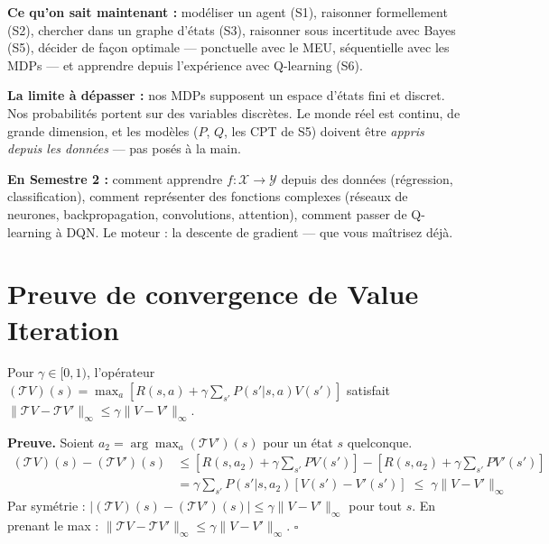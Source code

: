 \documentclass[11pt,a4paper]{article}
\begin{document}
\begin{prereqbox}
\textbf{Ce qu'on sait maintenant :} modéliser un agent (S1), raisonner formellement (S2), chercher dans un graphe d'états (S3), raisonner sous incertitude avec Bayes (S5), décider de façon optimale --- ponctuelle avec le MEU, séquentielle avec les MDPs --- et apprendre depuis l'expérience avec Q-learning (S6).

\textbf{La limite à dépasser :} nos MDPs supposent un espace d'états fini et discret. Nos probabilités portent sur des variables discrètes. Le monde réel est continu, de grande dimension, et les modèles ($P$, $Q$, les CPT de S5) doivent être \textit{appris depuis les données} --- pas posés à la main.

\textbf{En Semestre 2 :} comment apprendre $f : \mathcal{X} \to \mathcal{Y}$ depuis des données (régression, classification), comment représenter des fonctions complexes (réseaux de neurones, backpropagation, convolutions, attention), comment passer de Q-learning à DQN. Le moteur : la descente de gradient --- que vous maîtrisez déjà.
\end{prereqbox}

\appendix

\section{Preuve de convergence de Value Iteration}

\begin{theorembox}
Pour $\gamma \in [0,1)$, l'opérateur $(\mathcal{T}V)(s) = \max_a [R(s,a) + \gamma \sum_{s'} P(s'|s,a) V(s')]$ satisfait $\|\mathcal{T}V - \mathcal{T}V'\|_\infty \leq \gamma \|V - V'\|_\infty$.
\end{theorembox}

\textbf{Preuve.} Soient $a_2 = \arg\max_a (\mathcal{T}V')(s)$ pour un état $s$ quelconque.
\begin{align*}
(\mathcal{T}V)(s) - (\mathcal{T}V')(s) &\leq [R(s,a_2) + \gamma \sum_{s'} P V(s')] - [R(s,a_2) + \gamma \sum_{s'} P V'(s')] \\
&= \gamma \sum_{s'} P(s'|s,a_2)[V(s') - V'(s')] \;\leq\; \gamma \|V-V'\|_\infty
\end{align*}
Par symétrie : $|(\mathcal{T}V)(s) - (\mathcal{T}V')(s)| \leq \gamma \|V-V'\|_\infty$ pour tout $s$. En prenant le max : $\|\mathcal{T}V - \mathcal{T}V'\|_\infty \leq \gamma \|V-V'\|_\infty$. \hfill $\square$
\end{document}
